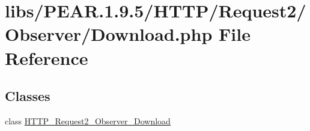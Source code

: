 \hypertarget{Download_8php}{}\section{libs/\+P\+E\+AR.1.9.5/\+H\+T\+T\+P/\+Request2/\+Observer/\+Download.php File Reference}
\label{Download_8php}
\subsection*{Classes}
\begin{DoxyCompactItemize}
\item 
class \hyperlink{classHTTP__Request2__Observer__Download}{H\+T\+T\+P\+\_\+\+Request2\+\_\+\+Observer\+\_\+\+Download}
\end{DoxyCompactItemize}
